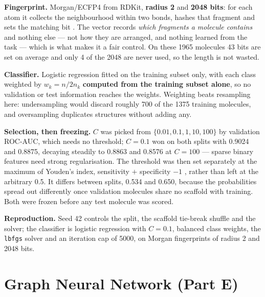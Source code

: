 \documentclass[10pt]{article}
\begin{document}
\textbf{Fingerprint.} Morgan/ECFP4 from RDKit, \textbf{radius 2} and \textbf{2048 bits}: for each atom it collects
the neighbourhood within two bonds, hashes that fragment and sets the matching bit \cite{ECFP}. The vector records
\emph{which fragments a molecule contains} and nothing else --- not how they are arranged, and nothing learned from
the task --- which is what makes it a fair control. On these 1965 molecules 43 bits are set on average and only 4 of
the 2048 are never used, so the length is not wasted.

\textbf{Classifier.} Logistic regression \cite{sklearn} fitted on the training subset only, with each class weighted
by $w_k = n/2n_k$ \textbf{computed from the training subset alone}, so no validation or test information reaches the
weights. Weighting beats resampling here: undersampling would discard roughly 700 of the 1375 training molecules,
and oversampling duplicates structures without adding any.

\textbf{Selection, then freezing.} $C$ was picked from $\{0.01, 0.1, 1, 10, 100\}$ by validation ROC-AUC, which needs
no threshold; $C = 0.1$ won on both splits with 0.9024 and 0.8875, decaying steadily to 0.8863 and 0.8576 at
$C = 100$ --- sparse binary features need strong regularisation. The threshold was then set separately at the maximum
of Youden's index, sensitivity $+$ specificity $-1$ \cite{Youden}, rather than left at the arbitrary 0.5. It differs
between splits, 0.534 and 0.650, because the probabilities spread out differently once validation molecules share no
scaffold with training. Both were frozen before any test molecule was scored.

\textbf{Reproduction.} Seed 42 controls the split, the scaffold tie-break shuffle and the solver; the classifier is
logistic regression with $C = 0.1$, balanced class weights, the \texttt{lbfgs} solver and an iteration cap of 5000,
on Morgan fingerprints of radius 2 and 2048 bits.

\section{Graph Neural Network (Part E)}
\label{sec:gnn}
\end{document}
